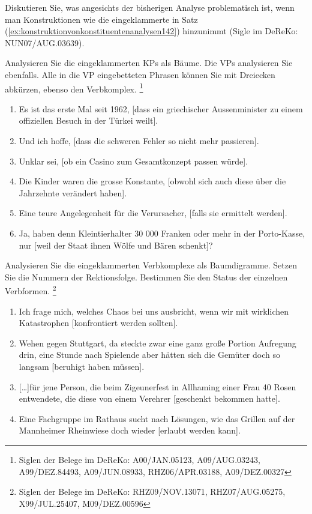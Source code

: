 \begin{sloppypar}
\Uebung[\tristar] \label{u113} Diskutieren Sie, was angesichts der bisherigen Analyse problematisch ist, wenn man Konstruktionen wie die eingeklammerte in Satz (\ref{ex:konstruktionvonkonstituentenanalysen142}) hinzunimmt (Sigle im DeReKo: NUN07\slash AUG.03639).

\begin{exe}
\end{exe}

\Uebung \label{u114} Analysieren Sie die eingeklammerten KPs als Bäume.
Die VPs analysieren Sie ebenfalls.
Alle in die VP eingebetteten Phrasen können Sie mit Dreiecken abkürzen, ebenso den Verbkomplex.%
\footnote{Siglen der Belege im DeReKo: A00\slash JAN.05123, A09\slash AUG.03243, A99\slash DEZ.84493, A09\slash JUN.08933, RHZ06\slash APR.03188, A09\slash DEZ.00327}

\begin{enumerate}
  \item Es ist das erste Mal seit 1962, [dass ein griechischer Aussenminister zu einem offiziellen Besuch in der Türkei weilt].
  \item Und ich hoffe, [dass die schweren Fehler so nicht mehr passieren].
  \item Unklar sei, [ob ein Casino zum Gesamtkonzept passen würde].
  \item Die Kinder waren die grosse Konstante, [obwohl sich auch diese über die Jahrzehnte verändert haben].
  \item Eine teure Angelegenheit für die Verursacher, [falls sie ermittelt werden].
  \item Ja, haben denn Kleintierhalter 30 000 Franken oder mehr in der Porto-Kasse, nur [weil der Staat ihnen Wölfe und Bären schenkt]?
\end{enumerate}

\Uebung \label{u115} Analysieren Sie die eingeklammerten Verbkomplexe als Baumdigramme.
Setzen Sie die Nummern der Rektionsfolge.
Bestimmen Sie den Status der einzelnen Verbformen.%
\footnote{Siglen der Belege im DeReKo: RHZ09\slash NOV.13071, RHZ07\slash AUG.05275, X99\slash JUL.25407, M09\slash DEZ.00596}

\begin{enumerate}
  \item Ich frage mich, welches Chaos bei uns ausbricht, wenn wir mit wirklichen Katastrophen [konfrontiert werden sollten].
  \item Wehen gegen Stuttgart, da steckte zwar eine ganz große Portion Aufregung drin, eine Stunde nach Spielende aber hätten sich die Gemüter doch so langsam [beruhigt haben müssen].
  \item{} [\ldots]für jene Person, die beim Zigeunerfest in Allhaming einer Frau 40 Rosen entwendete, die diese von einem Verehrer [geschenkt bekommen hatte].
  \item Eine Fachgruppe im Rathaus sucht nach Lösungen, wie das Grillen auf der Mannheimer Rheinwiese doch wieder [erlaubt werden kann].
\end{enumerate}

\end{sloppypar}
